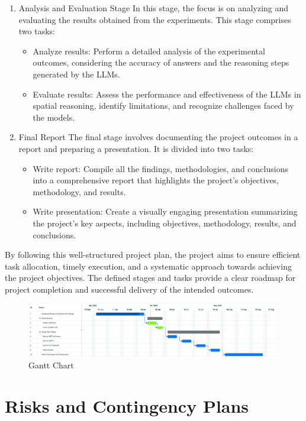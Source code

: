 \documentclass[journal,10pt]{IEEEtran}
\begin{document}
\begin{enumerate}
\begin{itemize}
    \end{itemize}
    \item Analysis and Evaluation Stage
    \subitem In this stage, the focus is on analyzing and evaluating the results obtained from the experiments. This stage comprises two tasks:
    \begin{itemize}
        \item Analyze results: Perform a detailed analysis of the experimental outcomes, considering the accuracy of answers and the reasoning steps generated by the LLMs.
        \item Evaluate results: Assess the performance and effectiveness of the LLMs in spatial reasoning, identify limitations, and recognize challenges faced by the models.
    \end{itemize}
    \item Final Report
    \subitem The final stage involves documenting the project outcomes in a report and preparing a presentation. It is divided into two tasks:
    \begin{itemize}
        \item Write report: Compile all the findings, methodologies, and conclusions into a comprehensive report that highlights the project's objectives, methodology, and results.
        \item Write presentation: Create a visually engaging presentation summarizing the project's key aspects, including objectives, methodology, results, and conclusions.
    \end{itemize}
\end{enumerate}

By following this well-structured project plan, the project aims to ensure efficient task allocation, timely execution, and a systematic approach towards achieving the project objectives. The defined stages and tasks provide a clear roadmap for project completion and successful delivery of the intended outcomes.
\begin{figure}[htbp]
    \centering
    \includegraphics[width=0.8\linewidth]{./pic/Gnatt.png}
    \caption{Gantt Chart}
    \label{fig:gantt}
\end{figure}

\newpage
\section{Risks and Contingency Plans}



\end{document}
